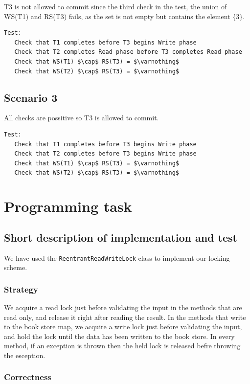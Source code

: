 \documentclass{article}
\theoremstyle{plain}
\theoremstyle{nonumberplain}
\begin{document}
T3 is not allowed to commit since the third check in the test, the union of WS(T1) and RS(T3) fails, as the set is not empty but contains the element $\{3\}$.
\begin{lstlisting}[mathescape]
Test:
   Check that T1 completes before T3 begins Write phase
   Check that T2 completes Read phase before T3 completes Read phase
   Check that WS(T1) $\cap$ RS(T3) = $\varnothing$
   Check that WS(T2) $\cap$ RS(T3) = $\varnothing$
\end{lstlisting}

\subsection{Scenario 3}

All checks are possitive so T3 is allowed to commit. 

\begin{lstlisting}[mathescape]
Test:
   Check that T1 completes before T3 begins Write phase
   Check that T2 completes before T3 begins Write phase
   Check that WS(T1) $\cap$ RS(T3) = $\varnothing$
   Check that WS(T2) $\cap$ RS(T3) = $\varnothing$
\end{lstlisting}

\section{Programming task}

\subsection{Short description of implementation and test}
We have used the \verb|ReentrantReadWriteLock| class to implement our locking scheme. 

\subsubsection{Strategy}

We acquire a read lock just before validating the input in the methods that are read only, and release it right after reading the result. In the methods that write to the book store map, we acquire a write lock just before validating the input, and hold the lock until the data has been written to the book store. In every method, if an exception is thrown then the held lock is released befre throwing the esception.

\subsubsection{Correctness}
\end{document}
